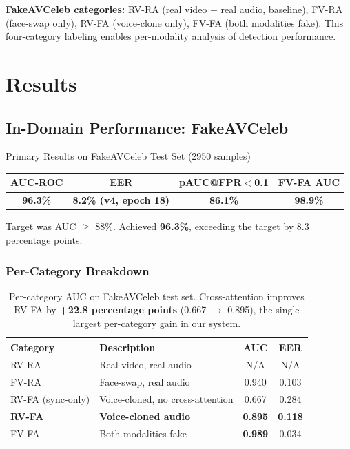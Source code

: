 \documentclass[12pt, letterpaper]{article}
\begin{document}
\textbf{FakeAVCeleb categories:} RV-RA (real video + real audio, baseline), FV-RA (face-swap only), RV-FA (voice-clone only), FV-FA (both modalities fake). This four-category labeling enables per-modality analysis of detection performance.

\section{Results}

\subsection{In-Domain Performance: FakeAVCeleb}

\begin{resultbox}{Primary Results on FakeAVCeleb Test Set (2950 samples)}
\begin{center}
\renewcommand{\arraystretch}{1.4}
\begin{tabular}{cccc}
\textbf{AUC-ROC} & \textbf{EER} & \textbf{pAUC@FPR$<$0.1} & \textbf{FV-FA AUC} \\
\midrule
\textbf{96.3\%} & \textbf{8.2\% (v4, epoch 18)} & \textbf{86.1\%} & \textbf{98.9\%} \\
\end{tabular}
\renewcommand{\arraystretch}{1.0}
\end{center}
Target was AUC $\geq$ 88\%. Achieved \textbf{96.3\%}, exceeding the target by 8.3 percentage points.
\end{resultbox}

\subsubsection{Per-Category Breakdown}

\renewcommand{\arraystretch}{1.5}
\begin{table}[H]
\centering
\begin{tabular}{@{} l l c c @{}}
\toprule
\textbf{Category} & \textbf{Description} & \textbf{AUC} & \textbf{EER} \\
\midrule
RV-RA & Real video, real audio & N/A & N/A \\
FV-RA & Face-swap, real audio & 0.940 & 0.103 \\
RV-FA (sync-only) & Voice-cloned, no cross-attention & 0.667 & 0.284 \\
\textbf{RV-FA} & \textbf{Voice-cloned audio} & \textbf{0.895} & \textbf{0.118} \\
FV-FA & Both modalities fake & \textbf{0.989} & 0.034 \\
\bottomrule
\end{tabular}
\caption{Per-category AUC on FakeAVCeleb test set. Cross-attention improves RV-FA by \textbf{+22.8 percentage points} (0.667 $\to$ 0.895), the single largest per-category gain in our system.}
\end{table}
\renewcommand{\arraystretch}{1.0}
\end{document}
